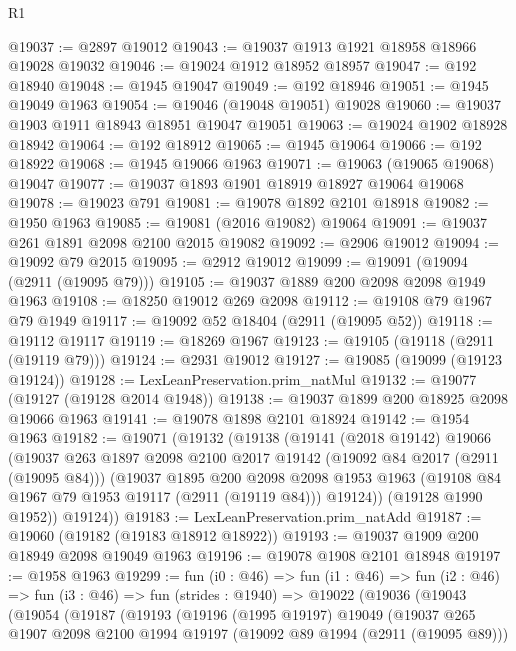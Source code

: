 \begin{lexlean}{R1}
\begin{coremodule}
@19037 := @2897 @19012
@19043 := @19037 @1913 @1921 @18958 @18966 @19028 @19032
@19046 := @19024 @1912 @18952 @18957
@19047 := @192 @18940
@19048 := @1945 @19047
@19049 := @192 @18946
@19051 := @1945 @19049 @1963
@19054 := @19046 (@19048 @19051) @19028
@19060 := @19037 @1903 @1911 @18943 @18951 @19047 @19051
@19063 := @19024 @1902 @18928 @18942
@19064 := @192 @18912
@19065 := @1945 @19064
@19066 := @192 @18922
@19068 := @1945 @19066 @1963
@19071 := @19063 (@19065 @19068) @19047
@19077 := @19037 @1893 @1901 @18919 @18927 @19064 @19068
@19078 := @19023 @791
@19081 := @19078 @1892 @2101 @18918
@19082 := @1950 @1963
@19085 := @19081 (@2016 @19082) @19064
@19091 := @19037 @261 @1891 @2098 @2100 @2015 @19082
@19092 := @2906 @19012
@19094 := @19092 @79 @2015
@19095 := @2912 @19012
@19099 := @19091 (@19094 (@2911 (@19095 @79)))
@19105 := @19037 @1889 @200 @2098 @2098 @1949 @1963
@19108 := @18250 @19012 @269 @2098
@19112 := @19108 @79 @1967 @79 @1949
@19117 := @19092 @52 @18404 (@2911 (@19095 @52))
@19118 := @19112 @19117
@19119 := @18269 @1967
@19123 := @19105 (@19118 (@2911 (@19119 @79)))
@19124 := @2931 @19012
@19127 := @19085 (@19099 (@19123 @19124))
@19128 := LexLeanPreservation.prim_natMul
@19132 := @19077 (@19127 (@19128 @2014 @1948))
@19138 := @19037 @1899 @200 @18925 @2098 @19066 @1963
@19141 := @19078 @1898 @2101 @18924
@19142 := @1954 @1963
@19182 := @19071
    (@19132
      (@19138
        (@19141
          (@2018 @19142)
          @19066
          (@19037
            @263
            @1897
            @2098
            @2100
            @2017
            @19142
            (@19092 @84 @2017 (@2911 (@19095 @84)))
            (@19037
              @1895
              @200
              @2098
              @2098
              @1953
              @1963
              (@19108 @84 @1967 @79 @1953 @19117 (@2911 (@19119 @84)))
              @19124))
          (@19128 @1990 @1952))
        @19124))
@19183 := LexLeanPreservation.prim_natAdd
@19187 := @19060 (@19182 (@19183 @18912 @18922))
@19193 := @19037 @1909 @200 @18949 @2098 @19049 @1963
@19196 := @19078 @1908 @2101 @18948
@19197 := @1958 @1963
@19299 := fun (i0 : @46) =>
  fun (i1 : @46) =>
  fun (i2 : @46) =>
  fun (i3 : @46) =>
  fun (strides : @1940) =>
  @19022
    (@19036
      (@19043
        (@19054
          (@19187
            (@19193
              (@19196
                (@1995 @19197)
                @19049
                (@19037
                  @265
                  @1907
                  @2098
                  @2100
                  @1994
                  @19197
                  (@19092 @89 @1994 (@2911 (@19095 @89)))

\end{coremodule}
\end{lexlean}
